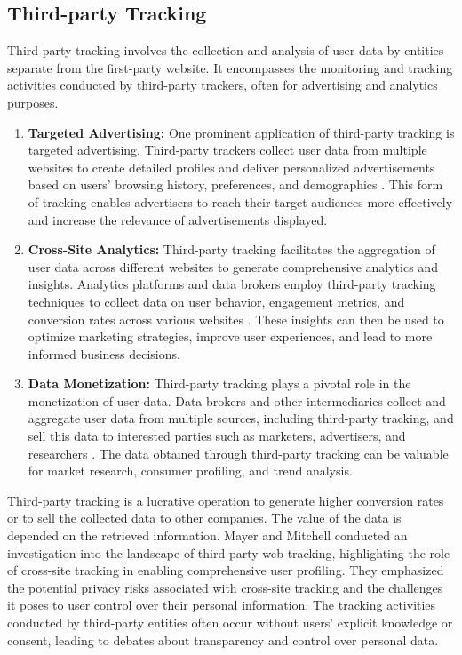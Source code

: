 \subsection{Third-party Tracking}
Third-party tracking involves the collection and analysis of user data by entities separate from the first-party website. It encompasses the monitoring and tracking activities conducted by third-party trackers, often
for advertising and analytics purposes.
\begin{enumerate}
  \item{\textbf{Targeted Advertising:} One prominent application of third-party tracking is targeted advertising.
      Third-party trackers collect user data from multiple websites to create detailed profiles and deliver personalized
      advertisements based on users' browsing history, preferences, and demographics \cite{agarwal2013not,acquisti2016economics,turow2009americans}. This form of tracking
      enables advertisers to reach their target audiences more effectively and increase the relevance of advertisements displayed.
    }
  \item{\textbf{Cross-Site Analytics:} Third-party tracking facilitates the aggregation of user data across different websites
      to generate comprehensive analytics and insights. Analytics platforms and data brokers employ third-party tracking techniques
      to collect data on user behavior, engagement metrics, and conversion rates across various websites \cite{googleAna}.
      These insights can then be used to optimize marketing strategies, improve user experiences, and lead to more informed business decisions.
    }
  \item{\textbf{Data Monetization:} Third-party tracking plays a pivotal role in the monetization of user data. Data brokers and
      other intermediaries collect and aggregate user data from multiple sources, including third-party tracking, and sell this
      data to interested parties such as marketers, advertisers, and researchers \cite{turow2015tradeoff}. The data obtained through
      third-party tracking can be valuable for market research, consumer profiling, and trend analysis.
    }
\end{enumerate}

Third-party tracking is a lucrative operation to generate higher conversion rates or to sell the collected data to other companies.
The value of the data is depended on the retrieved information. Mayer and Mitchell \cite{mayer2012third} conducted an investigation into the landscape of third-party
web tracking, highlighting the role of cross-site tracking in enabling comprehensive user profiling.
They emphasized the potential privacy risks associated with cross-site tracking and the challenges
it poses to user control over their personal information. The tracking activities conducted by third-party
entities often occur without users' explicit knowledge or consent, leading to debates about
transparency and control over personal data.
